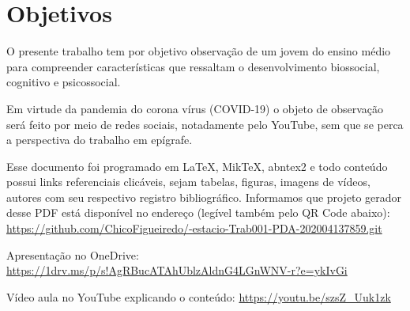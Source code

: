 \chapter{Objetivos}

O presente trabalho tem por objetivo observação de um jovem do ensino médio para compreender características  que ressaltam o  desenvolvimento  biossocial, cognitivo e psicossocial.

Em virtude da pandemia do corona vírus (COVID-19) o objeto de observação será feito por meio de redes sociais, notadamente pelo YouTube, sem que se perca a perspectiva do trabalho em epígrafe.




Esse documento foi programado em \LaTeX, MikTeX, abntex2 e todo conteúdo possui links referenciais clicáveis, sejam tabelas, figuras, imagens de vídeos, autores com seu respectivo registro bibliográfico.
Informamos que projeto gerador desse PDF está disponível no endereço (legível também pelo QR Code abaixo): \\
\url{https://github.com/ChicoFigueiredo/-estacio-Trab001-PDA-202004137859.git} \\
\begin{center}
    \href{https://github.com/ChicoFigueiredo/-estacio-Trab001-PDA-202004137859.git}{
    }
\end{center}


Apresentação no OneDrive: \url{https://1drv.ms/p/s!AgRBucATAhUblzAldnG4LGnWNV-r?e=ykIvGi} \\
\begin{center}
    \href{https://1drv.ms/p/s!AgRBucATAhUblzAldnG4LGnWNV-r?e=ykIvGi}{
    }
\end{center}




Vídeo aula no YouTube explicando o conteúdo: \url{https://youtu.be/szsZ_Uuk1zk} \\
\begin{center}
    \href{https://youtu.be/szsZ_Uuk1zk}{
    }
\end{center}
